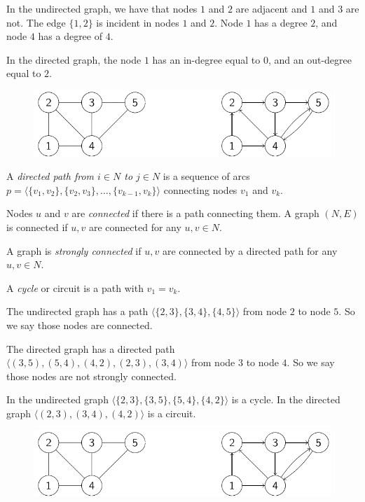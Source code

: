 \documentclass[12pt, a4paper]{report}
\newtheorem[style=M,bodystyle=\normalfont]{theorem}{Theorem}
\newtheorem[style=M,bodystyle=\normalfont]{corollary}{Corollary}
\newtheorem[style=M,bodystyle=\normalfont]{lemma}{Lemma}
\newtheorem[style=M,bodystyle=\normalfont]{definition}{Definition}
\begin{document}
    \begin{example}

        In the undirected graph, we have that nodes $1$ and $2$ are adjacent and $1$ and $3$ are not. The edge $\{1,2\}$ is incident in nodes $1$ and $2$. Node $1$ has a degree $2$,
        and node $4$ has a degree of $4$. 

        In the directed graph, the node $1$ has an in-degree equal to $0$, and an out-degree equal to $2$.
        \begin{figure}[H]
            \centering
            \includegraphics[width=0.75\linewidth]{images/graph.png}
        \end{figure}
    \end{example}
    \begin{definition}
        A \emph{directed path from $i \in N$ to $j \in N$} is a sequence of arcs $p=\langle \{v_1,v_2\},\{v_2,v_3\},\dots,\{v_{k-1},v_k\}\rangle $ connecting nodes $v_1$ and $v_k$.

        Nodes $u$ and $v$ are \emph{connected} if there is a path connecting them. A graph $(N,E)$ is connected if $u,v$ are connected for any $u,v \in N$. 
        
        A graph is \emph{strongly connected} if $u,v$ are connected by a directed path for any $u,v \in N$. 
        
        A \emph{cycle} or circuit is a path with $v_1=v_k$.
    \end{definition}
    \begin{example}
        The undirected graph has a path $\langle \{2,3\},\{3,4\},\{4,5\}\rangle$ from node $2$ to node $5$. So we say those nodes are connected. 
        
        The directed graph has a directed path $\langle (3,5),(5,4),(4,2),(2,3),(3,4) \rangle$ from node $3$ to node $4$. So we say those nodes are not strongly connected. 
        
        In the undirected graph $\langle \{2,3\},\{3,5\},\{5,4\},\{4,2\}\rangle$ is a cycle. 
        In the directed graph $\langle (2,3),(3,4),(4,2) \rangle$ is a circuit. 
        \begin{figure}[H]
            \centering
            \includegraphics[width=0.75\linewidth]{images/graph.png}
        \end{figure}
    \end{example}
\end{document}
